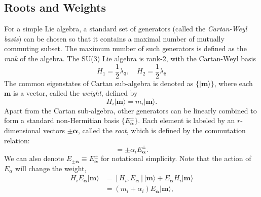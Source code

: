 \documentclass[aps,prb,superscriptaddress,nofootinbib]{revtex4}
\begin{document}
\subsection{Roots and Weights}
For a simple Lie algebra, a standard set of generators (called the \textit{Cartan-Weyl basis}) can be chosen so that it contains a maximal number of mutually commuting subset.
The maximum number of such generators is defined as the \textit{rank} of the algebra.
The SU(3) Lie algebra is rank-2, with the Cartan-Weyl basis
\begin{equation}
	H_1 = \frac{1}{2}\lambda_3, \quad H_2 = \frac{1}{2}\lambda_8
\end{equation}
The common eigenstates of Cartan sub-algebra is denoted as $\{|\bm m\rangle\}$, where each $\bm m$ is a vector, called the \textit{weight}, defined by
\begin{equation}
	H_i |\bm m\rangle = m_i |\bm m\rangle.
\end{equation}
Apart from the Cartan sub-algebra, other generators can be linearly combined to form a standard non-Hermitian basis $\{E^\pm_{\bm \alpha}\}$.
Each element is labeled by an $r$-dimensional vectors $\pm \bm\alpha$, called the \textit{root}, which is defined by the commutation relation:
\begin{equation}
	[H_i, E_{\bm \alpha}^\pm] = \pm \alpha_i E^\pm_{\bm \alpha}.
\end{equation}
We can also denote $E_{\pm\bm{\alpha}} \equiv E_{\bm{\alpha}}^\pm$ for notational simplicity.
Note that the action of $E_\alpha$ will change the weight,
\begin{equation}
\begin{aligned}
	H_i E_{\bm \alpha}|\bm m\rangle 
	&= [H_i, E_{\bm \alpha}]|\bm m\rangle + E_{\bm \alpha} H_i |\bm m\rangle \\
	&= (m_i + \alpha_i) E_{\bm \alpha}|\bm m\rangle,
\end{aligned}
\end{equation}
\end{document}
